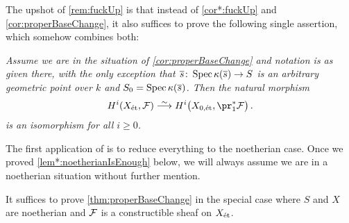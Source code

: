 \documentclass[a4paper, 10pt, oneside, DIV=9, chapterprefix=true, numbers=enddot, bibliography=totoc]{scrbook}
\begin{document}
\begin{rem*}\label{rem:fuckUp2}
	The upshot of \cref{rem:fuckUp} is that instead of \cref{cor*:fuckUp} and \cref{cor:properBaseChange}, it also suffices to prove the following single assertion, which somehow combines both:
	\begin{alphanumerate}
		\item[\itememph{\boxtimes}] \itshape Assume we are in the situation of \cref{cor:properBaseChange} and notation is as given there,  with the only exception that $\ov{s}\colon \Spec \kappa(\ov{s})\morphism S$ is an arbitrary geometric point over $k$ and $S_0=\Spec \kappa(\ov{s})$. Then the natural morphism
		\begin{equation*}
		H^i(X_\et,\Ff)\isomorphism H^i\big(X_{0,\et},\pr_1^*\Ff\big)\,.
		\end{equation*}
		is an isomorphism for all $i\geq 0$.\upshape
	\end{alphanumerate}
\end{rem*}
The first application of \itememph{\boxtimes} is to reduce everything to the noetherian case. Once we proved \cref{lem*:noetherianIsEnough} below, we will always assume we are in a noetherian situation without further mention.
\begin{lem*}\label{lem*:noetherianIsEnough}
	It suffices to prove \cref{thm:properBaseChange} in the special case where $S$ and $X$ are noetherian and $\mathcal{F}$ is a constructible sheaf on $X_{\mathrm{\acute{e}t}}$.
\end{lem*}
\end{document}
